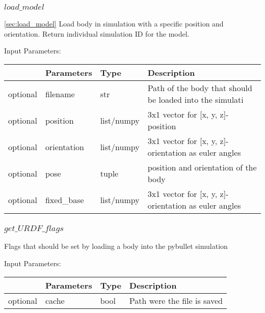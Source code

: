 \documentclass[
	ngerman,
	accentcolor=9c,%
	type=intern,
	marginpar=false
	]{tudapub}
\begin{document}
\vspace{0.5cm}



\subsubsection{$load\_model$}
\ref{sec:load_model}
\noindent Load body in simulation with a specific position and orientation. Return individual simulation ID for the model.


\vspace{0.5cm}
\noindent Input Parameters:
\vspace{0.5cm}

\begin{tabular}{|p{}|p{}|p{}| p{}|}
\hline
 & \textbf{Parameters} & \textbf{Type} & \textbf{Description} \\
\hline
optional & filename & str & Path of the body that should be loaded into the simulati\\
\hline
optional & position & list/numpy & 3x1 vector for [x, y, z]-position\\
\hline
optional & orientation & list/numpy & 3x1 vector for [x, y, z]-orientation as euler angles\\
\hline
optional & pose & tuple & position and orientation of the body\\
\hline
optional & fixed\_base & list/numpy & 3x1 vector for [x, y, z]-orientation as euler angles\\
\hline
\end{tabular}
\vspace{0.5cm}


\subsubsection{$get\_URDF\_flags$}
\noindent Flags that should be set by loading a body into the pybullet simulation

\vspace{0.5cm}
\noindent Input Parameters:
\vspace{0.5cm}

\begin{tabular}{|p{}|p{}|p{}| p{}|}
\hline
 & \textbf{Parameters} & \textbf{Type} & \textbf{Description} \\
\hline
optional & cache & bool & Path were the file is saved\\
\hline
\end{tabular}
\vspace{0.5cm}
\end{document}
